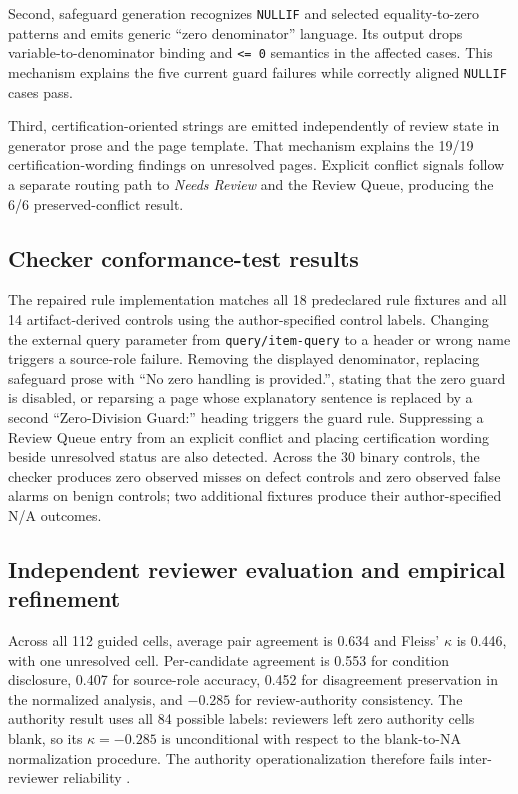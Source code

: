 \documentclass[a4paper,fleqn]{cas-dc}
\begin{document}
Second, safeguard generation recognizes \texttt{NULLIF} and selected equality-to-zero patterns and emits generic ``zero denominator'' language. Its output drops variable-to-denominator binding and \texttt{<= 0} semantics in the affected cases. This mechanism explains the five current guard failures while correctly aligned \texttt{NULLIF} cases pass.

Third, certification-oriented strings are emitted independently of review state in generator prose and the page template. That mechanism explains the 19/19 certification-wording findings on unresolved pages. Explicit conflict signals follow a separate routing path to \emph{Needs Review} and the Review Queue, producing the 6/6 preserved-conflict result.

\subsection{Checker conformance-test results}
The repaired rule implementation matches all 18 predeclared rule fixtures and all 14 artifact-derived controls using the author-specified control labels. Changing the external query parameter from \texttt{query/item-query} to a header or wrong name triggers a source-role failure. Removing the displayed denominator, replacing safeguard prose with ``No zero handling is provided.'', stating that the zero guard is disabled, or reparsing a page whose explanatory sentence is replaced by a second ``Zero-Division Guard:'' heading triggers the guard rule. Suppressing a Review Queue entry from an explicit conflict and placing certification wording beside unresolved status are also detected. Across the 30 binary controls, the checker produces zero observed misses on defect controls and zero observed false alarms on benign controls; two additional fixtures produce their author-specified N/A outcomes.


\subsection{Independent reviewer evaluation and empirical refinement}
Across all 112 guided cells, average pair agreement is 0.634 and Fleiss' $\kappa$ is 0.446, with one unresolved cell. Per-candidate agreement is 0.553 for condition disclosure, 0.407 for source-role accuracy, 0.452 for disagreement preservation in the normalized analysis, and $-0.285$ for review-authority consistency. The authority result uses all 84 possible labels: reviewers left zero authority cells blank, so its $\kappa=-0.285$ is unconditional with respect to the blank-to-NA normalization procedure. The authority operationalization therefore fails inter-reviewer reliability \citep{Fleiss1971}.
\end{document}
